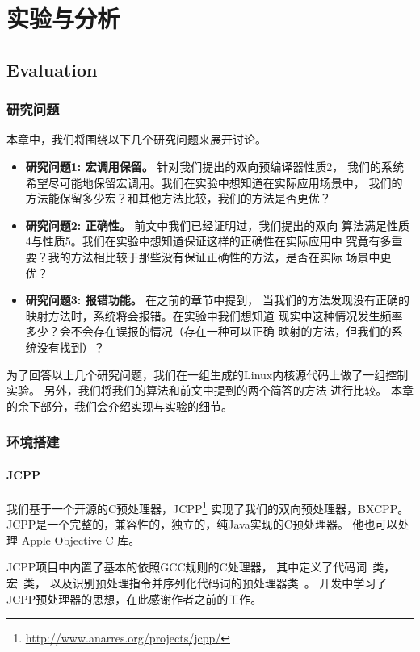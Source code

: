\chapter{实验与分析}
\section{Evaluation}
\label{sec:evaluation}
\subsection{研究问题}
本章中，我们将围绕以下几个研究问题来展开讨论。
\begin{itemize}
\item {\bf 研究问题1: 宏调用保留。} 针对我们提出的双向预编译器性质2，
  我们的系统希望尽可能地保留宏调用。我们在实验中想知道在实际应用场景中，
  我们的方法能保留多少宏？和其他方法比较，我们的方法是否更优？
\item {\bf 研究问题2: 正确性。} 前文中我们已经证明过，我们提出的双向
  算法满足性质4与性质5。我们在实验中想知道保证这样的正确性在实际应用中
  究竟有多重要？我的方法相比较于那些没有保证正确性的方法，是否在实际
  场景中更优？
\item {\bf 研究问题3: 报错功能。}  在之前的章节中提到，
  当我们的方法发现没有正确的映射方法时，系统将会报错。在实验中我们想知道
  现实中这种情况发生频率多少？会不会存在误报的情况（存在一种可以正确
  映射的方法，但我们的系统没有找到）？
\end{itemize}

为了回答以上几个研究问题，我们在一组生成的Linux内核源代码上做了一组控制
实验。
另外，我们将我们的算法和前文中提到的两个简答的方法
进行比较。
本章的余下部分，我们会介绍实现与实验的细节。

\subsection{环境搭建}

\subsubsection{JCPP}
我们基于一个开源的C预处理器，JCPP\footnote{\url{http://www.anarres.org/projects/jcpp/}}
实现了我们的双向预处理器，BXCPP。
JCPP是一个完整的，兼容性的，独立的，纯Java实现的C预处理器。
他也可以处理 Apple Objective C 库。

JCPP项目中内置了基本的依照GCC规则的C处理器，
其中定义了代码词~类，宏~类，
以及识别预处理指令并序列化代码词的预处理器类~。
开发中学习了JCPP预处理器的思想，在此感谢作者之前的工作。

